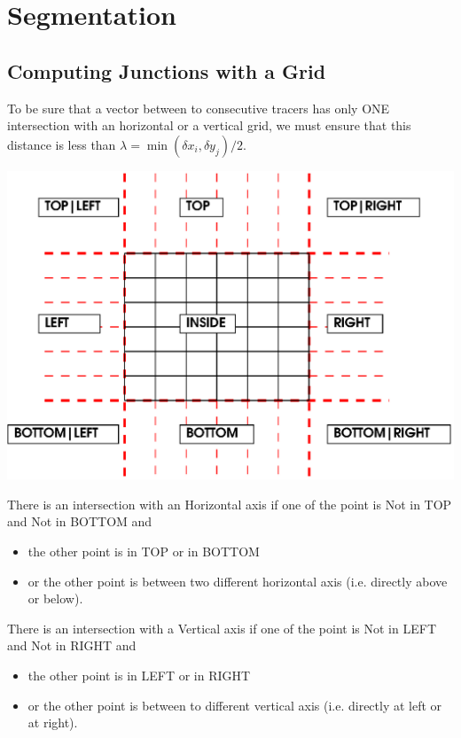 \documentclass[aps]{revtex4}
\begin{document}
\section{Segmentation}
\subsection{Computing Junctions with a Grid}

To be sure that a vector between to consecutive tracers has only ONE intersection with an horizontal or a vertical
grid, we must ensure that this distance is less than $\lambda=\min(\delta x_i,\delta y_j)/2$.

\begin{center}
\includegraphics[scale=1]{grid.eps}
\end{center}

There is an intersection with an Horizontal axis if one of the point is Not in TOP and Not in BOTTOM and
\begin{itemize}
	\item the other point is in TOP or in BOTTOM
	\item or the other point is between two different horizontal axis (i.e. directly above or below).
\end{itemize}

There is an intersection with a Vertical axis if one of the point is Not in LEFT and Not in RIGHT and
\begin{itemize}
	\item the other point is in LEFT or in RIGHT
	\item or the other point is between to different vertical axis (i.e. directly at left or at right). 
\end{itemize}
\end{document}
